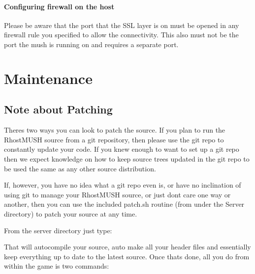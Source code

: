\documentclass[letterpaper,10pt,english]{sphinxmanual}
\begin{document}
\subsubsection{Configuring firewall on the host}
\label{\detokenize{security:configuring-firewall-on-the-host}}
\sphinxAtStartPar
Please be aware that the port that the SSL layer is on must be opened
in any firewall rule you specified to allow the connectivity.  This also must
not be the port the mush is running on and requires a separate port.


\chapter{Maintenance}
\label{\detokenize{maintenance:maintenance}}\label{\detokenize{maintenance::doc}}

\section{Note about Patching}
\label{\detokenize{maintenance:note-about-patching}}
\sphinxAtStartPar
There\textquotesingle{}s two ways you can look to patch the source.  If you plan to run the
RhostMUSH source from a git repository, then please use the git repo to
constantly update your code.  If you knew enough to want to set up a git repo
then we expect knowledge on how to keep source trees updated in the git repo
to be used the same as any other source distribution.

\sphinxAtStartPar
If, however, you have no idea what a git repo even is, or have no inclination
of using git to manage your RhostMUSH source, or just don\textquotesingle{}t care one way
or another, then you can use the included patch.sh routine (from under the
Server directory) to patch your source at any time.

\sphinxAtStartPar
From the server directory just type:

\begin{sphinxVerbatim}[commandchars=\\\{\}]
\end{sphinxVerbatim}

\sphinxAtStartPar
That will auto\sphinxhyphen{}compile your source, auto make all your header files and
essentially keep everything up to date to the latest source.
Once that\textquotesingle{}s done, all you do from within the game is two commands:

\begin{sphinxVerbatim}[commandchars=\\\{\}]
           
           
\end{sphinxVerbatim}
\end{document}
